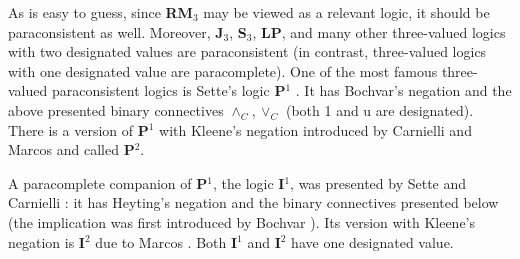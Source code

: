 \documentclass[10pt,a4paper]{article}
\theoremstyle{definition}
\newcommand{\3}{\vspace{.3in}}
\newcommand{\2}{\vspace{.2in}}
\newcommand{\1}{\vspace{.1in}}
\newcommand{\5}{\vspace{.05in}}
\begin{document}
As is easy to guess, since {\bf RM$_3$} may be viewed as a relevant logic, it should be paraconsistent as well. Moreover, {\bf J$_3$}, {\bf S$_3$}, {\bf LP}, and many other three-valued logics with two designated values are paraconsistent (in contrast, three-valued logics with one designated value are paracomplete). One of the most famous three-valued paraconsistent logics is Sette's logic {\bf P$ ^1 $} \cite{Sette}. It has Bochvar's negation and the above presented binary connectives $\wedge_C, \vee_C$  (both 1 and u are designated). There is a version of {\bf P$ ^1 $} with Kleene's negation introduced by Carnielli and Marcos \cite{CarnielliMarcos,Marcos} and called {\bf P$ ^2 $}.

A paracomplete companion of {\bf P$ ^1 $}, the logic {\bf I$ ^1 $}, was presented by Sette and Carnielli \cite{SetteCarnieli}: it has Heyting's negation and the binary connectives presented below (the implication was first introduced by Bochvar \cite{Bochvar}). Its version with Kleene's negation is {\bf I$ ^2 $} due to Marcos \cite{Marcos}. Both {\bf I$ ^1 $} and {\bf I$ ^2 $} have one designated value.
\end{document}
